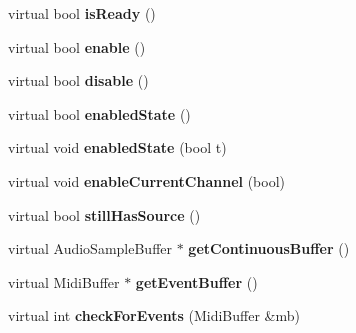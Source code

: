 \begin{DoxyCompactItemize}
\item 
\hypertarget{classGenericProcessor_a019dc0a595127889b42e835b23db07f5}{virtual bool {\bfseries is\-Ready} ()}\label{classGenericProcessor_a019dc0a595127889b42e835b23db07f5}

\item 
\hypertarget{classGenericProcessor_aef8d92d5d667f0e9d4b2d334ddf37380}{virtual bool {\bfseries enable} ()}\label{classGenericProcessor_aef8d92d5d667f0e9d4b2d334ddf37380}

\item 
\hypertarget{classGenericProcessor_aac6a1a695bce499b07418efa1fde55f2}{virtual bool {\bfseries disable} ()}\label{classGenericProcessor_aac6a1a695bce499b07418efa1fde55f2}

\item 
\hypertarget{classGenericProcessor_a3f74e259858f741b6f1435ad8557884c}{virtual bool {\bfseries enabled\-State} ()}\label{classGenericProcessor_a3f74e259858f741b6f1435ad8557884c}

\item 
\hypertarget{classGenericProcessor_a82e6b660b3ccdd175b26ca1f7c89155e}{virtual void {\bfseries enabled\-State} (bool t)}\label{classGenericProcessor_a82e6b660b3ccdd175b26ca1f7c89155e}

\item 
\hypertarget{classGenericProcessor_ad5f545d93e0409b97f0f5a2a27a83b3a}{virtual void {\bfseries enable\-Current\-Channel} (bool)}\label{classGenericProcessor_ad5f545d93e0409b97f0f5a2a27a83b3a}

\item 
\hypertarget{classGenericProcessor_a93c1a537897142d16003a45661b95920}{virtual bool {\bfseries still\-Has\-Source} ()}\label{classGenericProcessor_a93c1a537897142d16003a45661b95920}

\item 
\hypertarget{classGenericProcessor_a2cc31f766d9e375cda9e240aa99d7f69}{virtual Audio\-Sample\-Buffer $\ast$ {\bfseries get\-Continuous\-Buffer} ()}\label{classGenericProcessor_a2cc31f766d9e375cda9e240aa99d7f69}

\item 
\hypertarget{classGenericProcessor_af0e8c9ba31626a779d4543b88925a0b1}{virtual Midi\-Buffer $\ast$ {\bfseries get\-Event\-Buffer} ()}\label{classGenericProcessor_af0e8c9ba31626a779d4543b88925a0b1}

\item 
\hypertarget{classGenericProcessor_a3670d2c14be198001b086cf9c8fc45b6}{virtual int {\bfseries check\-For\-Events} (Midi\-Buffer \&mb)}\label{classGenericProcessor_a3670d2c14be198001b086cf9c8fc45b6}


\end{DoxyCompactItemize}
